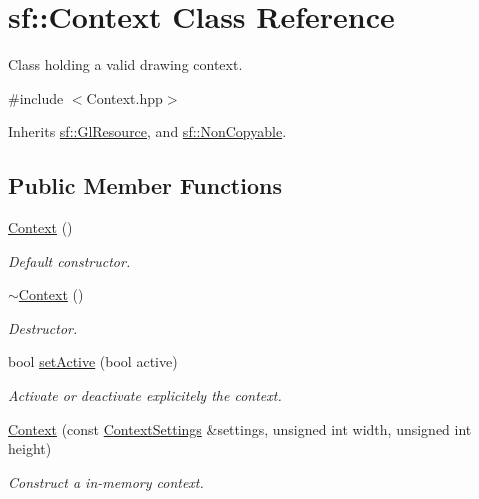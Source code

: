 \hypertarget{classsf_1_1_context}{\section{sf\+:\+:Context Class Reference}
\label{classsf_1_1_context}
}


Class holding a valid drawing context.  




{\ttfamily \#include $<$Context.\+hpp$>$}



Inherits \hyperlink{classsf_1_1_gl_resource}{sf\+::\+Gl\+Resource}, and \hyperlink{classsf_1_1_non_copyable}{sf\+::\+Non\+Copyable}.

\subsection*{Public Member Functions}
\begin{DoxyCompactItemize}
\item 
\hyperlink{classsf_1_1_context_aba22797a790706ca2c5c04ee39f2b555}{Context} ()
\begin{DoxyCompactList}\small\item\em Default constructor. \end{DoxyCompactList}\item 
\hyperlink{classsf_1_1_context_a805b1bbdb3e52b1fda7c9bf2cd6ca86b}{$\sim$\+Context} ()
\begin{DoxyCompactList}\small\item\em Destructor. \end{DoxyCompactList}\item 
bool \hyperlink{classsf_1_1_context_a0806f915ea81ae1f4e8135a7a3696562}{set\+Active} (bool active)
\begin{DoxyCompactList}\small\item\em Activate or deactivate explicitely the context. \end{DoxyCompactList}\item 
\hyperlink{classsf_1_1_context_a2a9e3529e48919120e6b6fc10bad296c}{Context} (const \hyperlink{structsf_1_1_context_settings}{Context\+Settings} \&settings, unsigned int width, unsigned int height)
\begin{DoxyCompactList}\small\item\em Construct a in-\/memory context. \end{DoxyCompactList}\end{DoxyCompactItemize}


